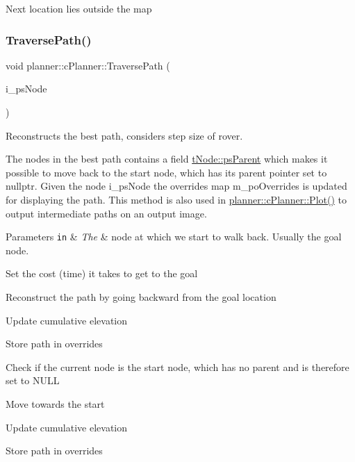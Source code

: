 Next location lies outside the map \mbox{\label{classplanner_1_1c_planner_a8624cb2afb8f2fd216c38b4424013178}} 
\subsubsection{\texorpdfstring{Traverse\+Path()}{TraversePath()}}
{\footnotesize\ttfamily void planner\+::c\+Planner\+::\+Traverse\+Path (\begin{DoxyParamCaption}\item[{std\+::shared\+\_\+ptr$<$ \mbox{\hyperlink{structplanner_1_1t_node}{t\+Node}} $>$ \&}]{i\+\_\+ps\+Node }\end{DoxyParamCaption})}



Reconstructs the best path, considers step size of rover. 

The nodes in the best path contains a field \mbox{\hyperlink{structplanner_1_1t_node_a297a5f7f75357b7a2eb2728ad452ff98}{t\+Node\+::ps\+Parent}} which makes it possible to move back to the start node, which has its parent pointer set to nullptr. Given the node i\+\_\+ps\+Node the overrides map m\+\_\+po\+Overrides is updated for displaying the path. This method is also used in \mbox{\hyperlink{classplanner_1_1c_planner_a236a68e02c7a99323f2d30b3097aa767}{planner\+::c\+Planner\+::\+Plot()}} to output intermediate paths on an output image. 
\begin{DoxyParams}[1]{Parameters}
\mbox{\tt in}  & {\em The} & node at which we start to walk back. Usually the goal node. \\
\hline
\end{DoxyParams}
Set the cost (time) it takes to get to the goal

Reconstruct the path by going backward from the goal location

Update cumulative elevation

Store path in overrides

Check if the current node is the start node, which has no parent and is therefore set to N\+U\+LL

Move towards the start

Update cumulative elevation

Store path in overrides \mbox{\label{classplanner_1_1c_planner_a16e8c156297fff49a6ba9b97073baffb}} 
